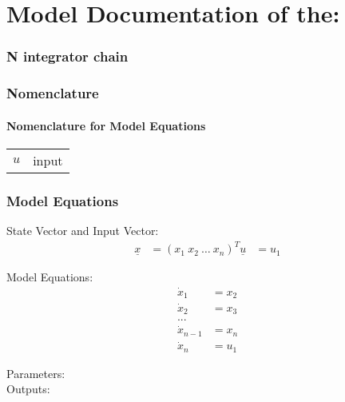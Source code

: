 \documentclass[10pt,a4paper]{article}
\begin{document}
	\part*{Model Documentation of the:}
	\section*{N integrator chain} %
	
	
	\section{Nomenclature} %
	\subsection{Nomenclature for Model Equations} %
	
	\begin{tabular}{ll}
		$u$ & input		
	\end{tabular}	
	
	
	\section{Model Equations} %
	State Vector and Input Vector:	
	\begin{align*}
		\underline{x} &= (x_1 \ x_2 \ \dots \ x_n)^T
		\underline{u} &= u_1
	\end{align*}

	\noindent Model Equations:
	\begin{subequations}
	\begin{align}
		\dot{x}_1 &= x_2 	\\      %
		\dot{x}_2 &= x_3	\\
		... &				\\
		\dot{x}_{n-1} &= x_n \\
		\dot{x}_n &= u_1 
	\end{align}
	\end{subequations}

	\noindent
	Parameters:  %
	\\
	Outputs:  %
	
\end{document}
